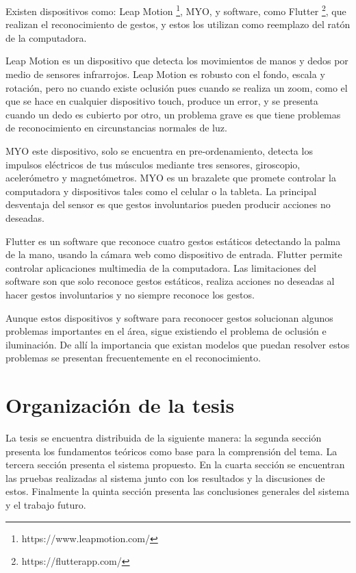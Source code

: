 Existen dispositivos como: Leap Motion \footnote{https://www.leapmotion.com/}, MYO, y software, como Flutter \footnote{https://flutterapp.com/}, que realizan el reconocimiento de gestos, y estos los utilizan como reemplazo del rat\'on de la computadora. 
 
Leap Motion es un dispositivo que detecta los movimientos de manos y dedos por medio de sensores infrarrojos. Leap Motion es robusto con el fondo, escala y rotaci\'on,  pero no cuando existe oclusi\'on pues cuando se realiza un zoom, como el que se hace en cualquier dispositivo touch, produce un error, y se presenta cuando un dedo es cubierto por otro, un problema grave es que tiene problemas de reconocimiento en circunstancias normales de luz.  

MYO este dispositivo, solo se encuentra en pre-ordenamiento, detecta los impulsos el\'ectricos de tus m\'usculos mediante tres sensores, giroscopio, aceler\'ometro y magnet\'ometros. MYO es un brazalete  que promete controlar la computadora y dispositivos tales como el celular o la tableta. La principal desventaja del sensor es que gestos involuntarios pueden producir acciones no deseadas.

Flutter  es un software que reconoce cuatro gestos est\'aticos detectando la palma de la mano, usando la c\'amara web como dispositivo de entrada. Flutter permite controlar aplicaciones multimedia de la computadora. 	Las limitaciones del software son que solo reconoce gestos est\'aticos, realiza acciones no deseadas al hacer gestos involuntarios y no siempre reconoce los gestos. 

Aunque estos dispositivos y software para reconocer gestos  solucionan algunos problemas importantes en el \'area, sigue existiendo el problema de oclusi\'on  e iluminaci\'on. De allí la importancia que existan modelos que puedan resolver estos problemas se presentan frecuentemente en el reconocimiento. 

\section{Organizaci\'on de la tesis}\label{sec:OrganizacionTesis}
La tesis se encuentra distribuida de la siguiente manera: la segunda sección presenta los fundamentos teóricos como base para la comprensión del tema. La tercera sección presenta el sistema propuesto. En la cuarta sección se encuentran las pruebas realizadas al sistema junto con los resultados y la discusiones de estos. Finalmente la quinta sección presenta las conclusiones generales del sistema y el trabajo futuro. 
	


